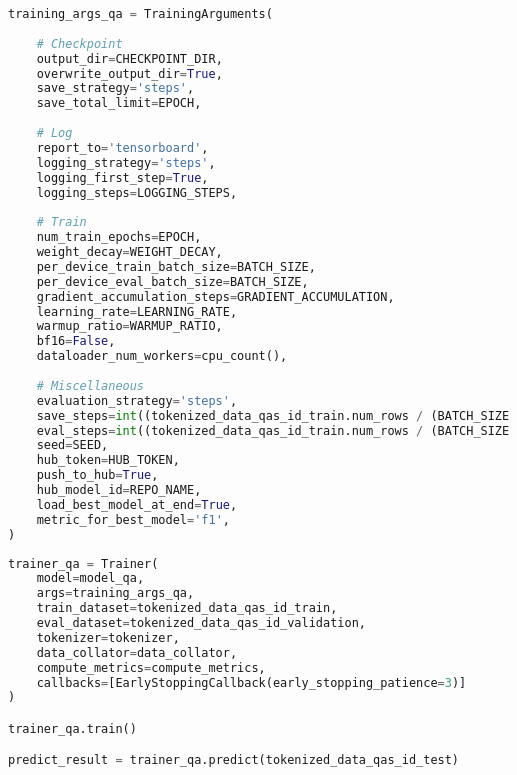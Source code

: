 \begin{lstlisting}[language=Python, caption=Perancangan metrik komputasi untuk penilaian \emph{question answering task}]
training_args_qa = TrainingArguments(
        
    # Checkpoint
    output_dir=CHECKPOINT_DIR,
    overwrite_output_dir=True,
    save_strategy='steps',
    save_total_limit=EPOCH,
    
    # Log
    report_to='tensorboard',
    logging_strategy='steps',
    logging_first_step=True,
    logging_steps=LOGGING_STEPS,
    
    # Train
    num_train_epochs=EPOCH,
    weight_decay=WEIGHT_DECAY,
    per_device_train_batch_size=BATCH_SIZE,
    per_device_eval_batch_size=BATCH_SIZE,
    gradient_accumulation_steps=GRADIENT_ACCUMULATION,
    learning_rate=LEARNING_RATE,
    warmup_ratio=WARMUP_RATIO,
    bf16=False,
    dataloader_num_workers=cpu_count(),
    
    # Miscellaneous
    evaluation_strategy='steps',
    save_steps=int((tokenized_data_qas_id_train.num_rows / (BATCH_SIZE * GRADIENT_ACCUMULATION)) * EVAL_STEPS_RATIO),
    eval_steps=int((tokenized_data_qas_id_train.num_rows / (BATCH_SIZE * GRADIENT_ACCUMULATION)) * EVAL_STEPS_RATIO),
    seed=SEED,
    hub_token=HUB_TOKEN,
    push_to_hub=True,
    hub_model_id=REPO_NAME,
    load_best_model_at_end=True,
    metric_for_best_model='f1',
)
\end{lstlisting}

\begin{lstlisting}[language=Python, caption=Melakukan \emph{training} dan prediksi jawaban \emph{question answering}]
trainer_qa = Trainer(
    model=model_qa,
    args=training_args_qa,
    train_dataset=tokenized_data_qas_id_train,
    eval_dataset=tokenized_data_qas_id_validation,
    tokenizer=tokenizer,
    data_collator=data_collator,
    compute_metrics=compute_metrics,
    callbacks=[EarlyStoppingCallback(early_stopping_patience=3)]
)

trainer_qa.train()

predict_result = trainer_qa.predict(tokenized_data_qas_id_test)
\end{lstlisting}

